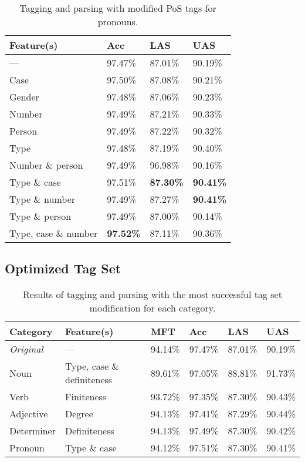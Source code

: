 \documentclass[11pt,a4paper]{article}
\begin{document}
\begin{table}
    \centering
    \smaller[0.5]
    \begin{tabular}{@{}llll@{}}
        \toprule
        \textbf{Feature(s)} & \textbf{Acc} & \textbf{LAS} & \textbf{UAS} \\
        \midrule
        --- & 97.47\% & 87.01\% & 90.19\% \\
        Case & 97.50\% & 87.08\% & 90.21\% \\
        Gender & 97.48\% & 87.06\% & 90.23\% \\
        Number & 97.49\% & 87.21\% & 90.33\% \\
        Person & 97.49\% & 87.22\% & 90.32\% \\
        Type & 97.48\% & 87.19\% & 90.40\% \\
        Number \& person & 97.49\% & 96.98\% & 90.16\% \\
        Type \& case & 97.51\% & \textbf{87.30\%} & \textbf{90.41\%} \\
        Type \& number & 97.49\% & 87.27\% & \textbf{90.41\%} \\
        Type \& person & 97.49\% & 87.00\% & 90.14\% \\
        Type, case \& number & \textbf{97.52\%} & 87.11\% & 90.36\% \\
        \bottomrule
    \end{tabular}
    \caption{Tagging and parsing with modified PoS tags for pronouns.}
    \label{pronresults}
\end{table}

\subsection{Optimized Tag Set}
\begin{table*}[ht]
    \centering
    \smaller[0.5]
    \begin{tabular}{@{}llllll@{}}
        \toprule
        \textbf{Category} & \textbf{Feature(s)} & \textbf{MFT} &
        \textbf{Acc} & \textbf{LAS} & \textbf{UAS} \\
        \midrule
        \emph{Original} & --- & 94.14\% & 97.47\% & 87.01\% & 90.19\% \\
        Noun & Type, case \& definiteness & 89.61\% & 97.05\% & 88.81\% &
        91.73\% \\
        Verb & Finiteness & 93.72\% & 97.35\% & 87.30\% & 90.43\% \\
        Adjective & Degree & 94.13\% & 97.41\% & 87.29\% & 90.44\% \\
        Determiner & Definiteness & 94.13\% & 97.49\% & 87.30\% & 90.42\% \\
        Pronoun & Type \& case & 94.12\% & 97.51\% & 87.30\% & 90.41\% \\
        \bottomrule
    \end{tabular}
    \caption{Results of tagging and parsing with the most successful tag set
        modification for each category.}
    \label{respectiveresults}
\end{table*}
\end{document}
